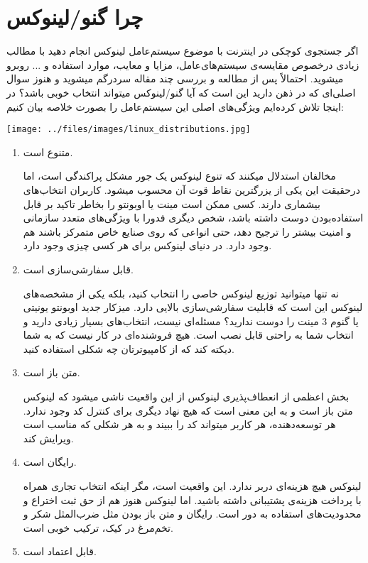 \section{چرا گنو/لینوکس}
اگر جستجوی کوچکی در اینترنت با موضوع سیستم‌عامل لینوکس انجام دهید با مطالب زیادی درخصوص مقایسه‌ی سیستم‌های‌عامل، مزایا و معایب، موارد استفاده و ... روبرو میشوید. احتمالاً پس از مطالعه و بررسی چند مقاله سردرگم میشوید و هنوز سوال اصلی‌ای که در ذهن دارید این است که آیا گنو/لینوکس میتواند انتخاب خوبی باشد؟ در اینجا تلاش کرده‌ایم ویژگی‌های اصلی این سیستم‌عامل را بصورت خلاصه بیان کنیم:

\texttt{[image: ../files/images/linux\_distributions.jpg]}

\begin{enumerate}
\item متنوع است.

مخالفان استدلال میکنند که تنوع لینوکس یک جور مشکل پراکندگی است، اما درحقیقت این یکی از یزرگترین نقاط قوت آن محسوب میشود. کاربران انتخاب‌های بیشماری دارند. کسی ممکن است مینت یا اوبونتو را بخاطر تاکید بر قابل استفاده‌بودن دوست داشته باشد، شخص دیگری فدورا با ویژگی‌های متعدد سازمانی و امنیت بیشتر را ترجیح دهد، حتی انواعی که روی صنایع خاص متمرکز باشند هم وجود دارد. در دنیای لینوکس برای هر کسی چیزی وجود دارد.

\item قابل سفارشی‌سازی است.

نه تنها میتوانید توزیع لینوکس خاصی را انتخاب کنید، بلکه یکی از مشخصه‌های لینوکس این است که قابلیت سفارشی‌سازی بالایی دارد. میزکار جدید اوبونتو یونیتی یا گنوم 3 مینت را دوست ندارید؟ مسئله‌ای نیست، انتخاب‌های بسیار زیادی دارید و انتخاب شما به راحتی قابل نصب است. هیچ فروشنده‌ای در کار نیست که به شما دیکته کند که از کامپیوترتان چه شکلی استفاده کنید.
\item متن باز است.

بخش اعظمی از انعطاف‌پذیری لینوکس از این واقعیت ناشی میشود که لینوکس متن باز است و به این معنی است که هیچ نهاد دیگری برای کنترل کد وجود ندارد. هر توسعه‌دهنده، هر کاربر میتواند کد را ببیند و به هر شکلی که مناسب است ویرایش کند.
\item  رایگان است.

لینوکس هیچ هزینه‌ای دربر ندارد. این واقعیت است، مگر اینکه انتخاب تجاری همراه با پرداخت هزینه‌ی پشتیبانی داشته باشید. اما لینوکس هنوز هم از حق ثبت اختراع و محدودیت‌های استفاده به دور است. رایگان و متن باز بودن مثل ضرب‌المثل شکر و تخم‌مرغ در کیک، ترکیب خوبی است.
\item  قابل اعتماد است.


\end{enumerate}
